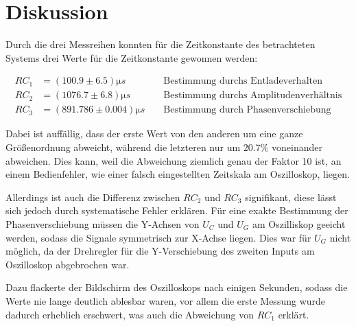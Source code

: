 \section{Diskussion}
\label{sec:Diskussion}
Durch die drei Messreihen konnten für die Zeitkonstante des betrachteten Systems drei
Werte für die Zeitkonstante gewonnen werden:

\begin{align}
	RC_1 &= (100.9 \pm 6.5) \si{\micro s} &
	\label{eqn:RC_1}
	     &\text{ Bestimmung durchs Entladeverhalten}
	\\
	RC_2 &= (1076.7 \pm 6.8) \si{\micro s} &
	\label{eqn:RC_2}
	     &\text{ Bestimmung durchs Amplitudenverhältnis}
	\\
	RC_3 &= (891.786 \pm 0.004) \si{\micro s} &
	\label{eqn:RC_3}
	     &\text{ Bestimmung durch Phasenverschiebung}
\end{align}

Dabei ist auffällig, dass der erste Wert von den anderen um eine ganze Größenordnung
abweicht, während die letzteren nur um $20.7\%$ voneinander abweichen. Dies kann, weil die 
Abweichung ziemlich genau der Faktor 10 ist, an einem Bedienfehler, wie einer falsch eingestellten
Zeitskala am Oszilloskop, liegen.

Allerdings ist auch die Differenz zwischen $RC_2$ und $RC_3$ signifikant, diese lässt sich jedoch
durch systematische Fehler erklären. Für eine exakte Bestimmung der Phasenverschiebung müssen
die Y-Achsen von $U_C$ und $U_G$ am Oszilliskop geeicht werden, sodass die Signale symmetrisch
zur X-Achse liegen. Dies war für $U_G$ nicht möglich, da der Drehregler für
die Y-Verschiebung des zweiten Inputs am Oszilloskop abgebrochen war.

Dazu flackerte der Bildschirm des Oszilloskops nach einigen Sekunden, sodass die Werte nie lange 
deutlich ablesbar waren, vor allem die erste Messung wurde dadurch erheblich erschwert, 
was auch die Abweichung von $RC_1$ erklärt.
